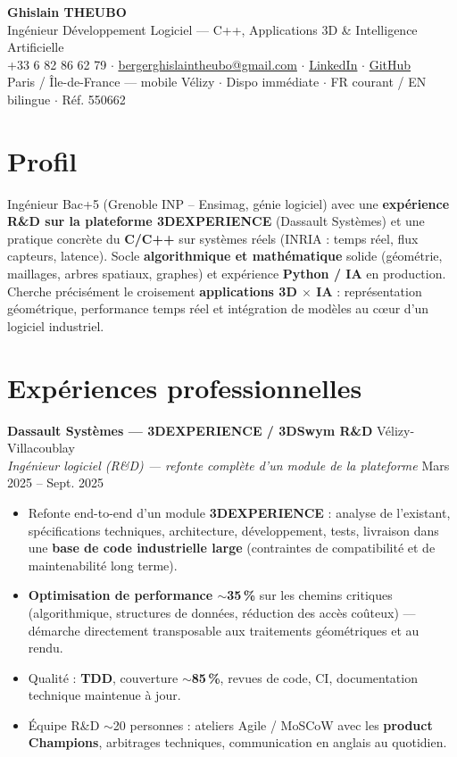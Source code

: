 \documentclass[10pt,a4paper]{article}
\begin{document}
\small

\begin{center}
{\LARGE\bfseries Ghislain THEUBO}\\[1pt]
{\large Ing\'enieur D\'eveloppement Logiciel --- C++, Applications 3D \& Intelligence Artificielle}\\[2pt]
+33 6 82 86 62 79 $\cdot$
\href{mailto:bergerghislaintheubo@gmail.com}{bergerghislaintheubo@gmail.com} $\cdot$
\href{https://www.linkedin.com/in/berger-ghislain}{LinkedIn} $\cdot$
\href{https://github.com/Bergerghislain}{GitHub}\\[1pt]
Paris / \^Ile-de-France --- mobile V\'elizy $\cdot$ Dispo imm\'ediate $\cdot$ FR courant / EN bilingue $\cdot$ R\'ef. 550662
\end{center}

\section{Profil}
Ing\'enieur Bac+5 (Grenoble INP -- Ensimag, g\'enie logiciel) avec une \textbf{exp\'erience R\&D sur la plateforme 3DEXPERIENCE} (Dassault Syst\`emes) et une pratique concr\`ete du \textbf{C/C++} sur syst\`emes r\'eels (INRIA : temps r\'eel, flux capteurs, latence). Socle \textbf{algorithmique et math\'ematique} solide (g\'eom\'etrie, maillages, arbres spatiaux, graphes) et exp\'erience \textbf{Python / IA} en production. Cherche pr\'ecis\'ement le croisement \textbf{applications 3D $\times$ IA} : repr\'esentation g\'eom\'etrique, performance temps r\'eel et int\'egration de mod\`eles au cœur d'un logiciel industriel.

\section{Exp\'eriences professionnelles}
\textbf{Dassault Syst\`emes --- 3DEXPERIENCE / 3DSwym R\&D} \hfill V\'elizy-Villacoublay\\
\textit{Ing\'enieur logiciel (R\&D) --- refonte compl\`ete d'un module de la plateforme} \hfill Mars 2025 -- Sept. 2025
\begin{itemize}
  \item Refonte end-to-end d'un module \textbf{3DEXPERIENCE} : analyse de l'existant, sp\'ecifications techniques, architecture, d\'eveloppement, tests, livraison dans une \textbf{base de code industrielle large} (contraintes de compatibilit\'e et de maintenabilit\'e long terme).
  \item \textbf{Optimisation de performance $\sim$35\,\%} sur les chemins critiques (algorithmique, structures de donn\'ees, r\'eduction des acc\`es co\^uteux) --- d\'emarche directement transposable aux traitements g\'eom\'etriques et au rendu.
  \item Qualit\'e : \textbf{TDD}, couverture $\sim$\textbf{85\,\%}, revues de code, CI, documentation technique maintenue \`a jour.
  \item \'Equipe R\&D $\sim$20 personnes : ateliers Agile / MoSCoW avec les \textbf{product Champions}, arbitrages techniques, communication en anglais au quotidien.
\end{itemize}
\end{document}
